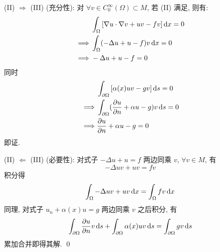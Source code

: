 \begin{solproof}[2]
(II) $\Rightarrow$ (III) (充分性):
对 $\forall v \in C_0^\infty(\Omega) \subset M$, 若 (II) 满足, 则有:
\begin{align*}
& \int_\Omega\left[ \nabla u\cdot\nabla v + uv - fv \right] \operatorname{d\!} x = 0 \\
\implies & \int_\Omega (-\Delta u + u - f) v \operatorname{d\!} x = 0 \\
\implies & -\Delta u + u - f = 0
\end{align*}
同时
\begin{align*}
& \int_{\partial\Omega}\left[ \alpha(x) uv - gv \right] \operatorname{d\!} s = 0 \\
\implies & \int_{\partial\Omega}
  ({\frac{\partial {u}}{\partial {n}}} + \alpha u - g) v \operatorname{d\!} s = 0 \\
\implies & {\frac{\partial {u}}{\partial {n}}} + \alpha u - g = 0
\end{align*}
即证.

\noindent (II) $\Leftarrow$ (III) (必要性):
对式子 $-\Delta u + u = f$ 两边同乘 $v$, $\forall v \in M$, 有
\[
-\Delta uv + uv = fv
\]
积分得
\[
\int_\Omega -\Delta uv + uv \operatorname{d\!} x = \int_\Omega fv \operatorname{d\!} x
\]
同理, 对式子 $u_n + \alpha(x) u = g$ 两边同乘 $v$ 之后积分, 有
\[
\int_{\partial\Omega} {\frac{\partial {u}}{\partial {n}}}v \operatorname{d\!} s
  + \int_{\partial\Omega} \alpha(x)uv \operatorname{d\!} s
  = \int_{\partial\Omega} gv \operatorname{d\!} s
\]
累加合并即得其解.
\qed
\end{solproof}
\endinput
